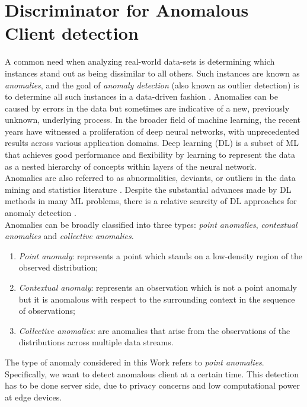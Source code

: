 \chapter{Discriminator for Anomalous Client detection}\label{chapter:disc}

A common need when analyzing real-world data-sets is determining which instances stand out as being dissimilar to all others. Such instances are known as \textit{anomalies}, and the goal of \textit{anomaly detection} (also known as outlier detection) is to determine all such instances in a data-driven fashion \cite{chandola2007outlier}. Anomalies can be caused by errors in the data but sometimes are indicative of a new, previously unknown, underlying process. In the broader field of machine learning, the recent years have witnessed a proliferation of deep neural networks, with unprecedented results across various application domains. Deep learning (DL) is a subset of ML that achieves good performance and flexibility by learning to represent the data as a nested hierarchy of concepts within layers of the neural network. \\

Anomalies are also referred to as abnormalities, deviants, or outliers in the data mining and statistics literature \cite{aggarwal2017introduction}. Despite the substantial advances made by DL methods in many ML problems, there is a relative scarcity of DL approaches for anomaly detection \cite{chalapathy2019deep}. \\

Anomalies can be broadly classified into three types: \textit{point anomalies}, \textit{contextual anomalies} and \textit{collective anomalies}.

\begin{enumerate}
    \item \textit{Point anomaly}: represents a point which stands on a low-density region of the observed distribution;
    
    \item \textit{Contextual anomaly}: represents an observation which is not a point anomaly but it is anomalous with respect to the surrounding context in the sequence of observations;
    
    \item \textit{Collective anomalies}: are anomalies that arise from the observations of the distributions across multiple data streams.
\end{enumerate}

The type of anomaly considered in this Work refers to \textit{point anomalies}. Specifically, we want to detect anomalous client at a certain time. This detection has to be done server side, due to privacy concerns and low computational power at edge devices. \\

